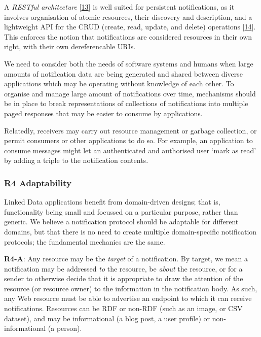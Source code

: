 \documentclass[]{article}
\begin{document}
A \emph{RESTful architecture} {[}\protect\hyperlink{ref-13}{13}{]} is
well suited for persistent notifications, as it involves organisation of
atomic resources, their discovery and description, and a lightweight API
for the CRUD (create, read, update, and delete) operations
{[}\protect\hyperlink{ref-14}{14}{]}. This enforces the notion that
notifications are considered resources in their own right, with their
own dereferencable URIs.

We need to consider both the needs of software systems and humans when
large amounts of notification data are being generated and shared
between diverse applications which may be operating without knowledge of
each other. To organise and manage large amount of notifications over
time, mechanisms should be in place to break representations of
collections of notifications into multiple paged responses that may be
easier to consume by applications.

Relatedly, receivers may carry out resource management or garbage
collection, or permit consumers or other applications to do so. For
example, an application to consume messages might let an authenticated
and authorised user `mark as read' by adding a triple to the
notification contents.

\hypertarget{adaptability}{}
\subsubsection{R4 Adaptability}\label{r4-adaptability}

Linked Data applications benefit from domain-driven designs; that is,
functionality being small and focussed on a particular purpose, rather
than generic. We believe a notification protocol should be adaptable for
different domains, but that there is no need to create multiple
domain-specific notification protocols; the fundamental mechanics are
the same.

\textbf{R4-A}: Any resource may be the \emph{target} of a notification.
By target, we mean a notification may be addressed \emph{to} the
resource, be \emph{about} the resource, or for a sender to otherwise
decide that it is appropriate to draw the attention of the resource (or
resource owner) to the information in the notification body. As such,
any Web resource must be able to advertise an endpoint to which it can
receive notifications. Resources can be RDF or non-RDF (such as an
image, or CSV dataset), and may be informational (a blog post, a user
profile) or non-informational (a person).
\end{document}
